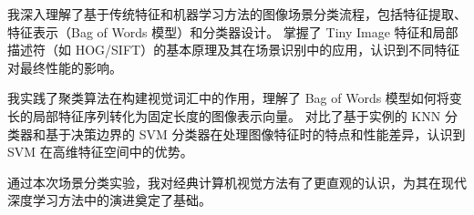 我深入理解了基于传统特征和机器学习方法的图像场景分类流程，包括特征提取、特征表示（Bag of Words 模型）和分类器设计。
掌握了 Tiny Image 特征和局部描述符（如 HOG/SIFT）的基本原理及其在场景识别中的应用，认识到不同特征对最终性能的影响。

我实践了聚类算法在构建视觉词汇中的作用，理解了 Bag of Words 模型如何将变长的局部特征序列转化为固定长度的图像表示向量。
对比了基于实例的 KNN 分类器和基于决策边界的 SVM 分类器在处理图像特征时的特点和性能差异，认识到 SVM 在高维特征空间中的优势。

通过本次场景分类实验，我对经典计算机视觉方法有了更直观的认识，为其在现代深度学习方法中的演进奠定了基础。
